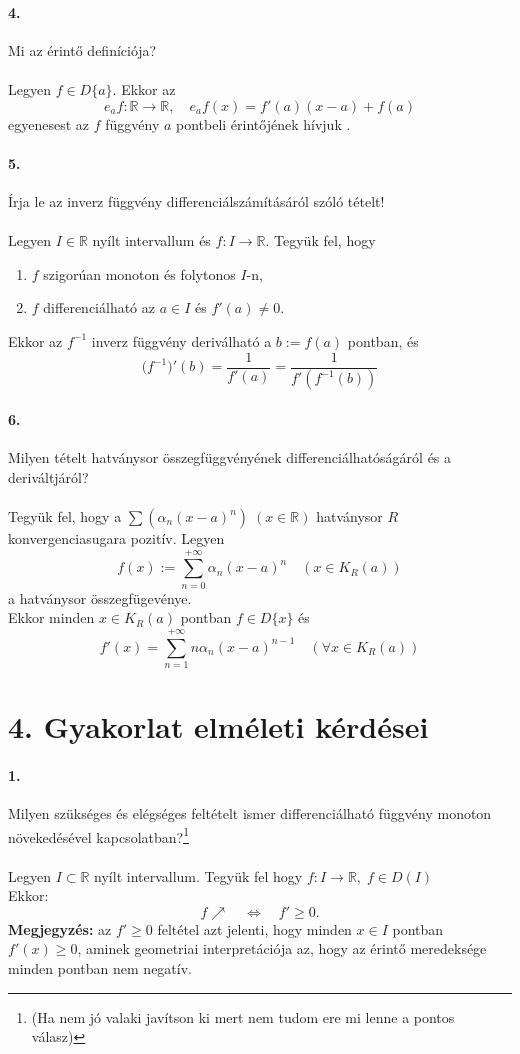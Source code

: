 \documentclass[10pt,a4paper]{article}
\newcommand{\R}{\mathbb{R}}
\renewcommand{\>}{\rightarrow}
\begin{document}
\paragraph{4.}
Mi az érintő definíciója? \\ \\
Legyen $f \in D\{a\}$. Ekkor az 
\[
e_af:\mathbb{R} \rightarrow \mathbb{R}, \quad	 e_af(x) =f'(a)(x-a)+f(a)
\]
egyenesest az $f$ függvény $a$ pontbeli érintőjének hívjuk .
\paragraph{5.}
Írja le az inverz függvény differenciálszámításáról szóló tételt!
\\ \\
Legyen $I\in\mathbb{R}$ nyílt intervallum és $f: I \rightarrow \mathbb{R}$.
Tegyük fel, hogy
\begin{enumerate}
\item $f$ szigorúan monoton és folytonos $I$-n,
\item $f$ differenciálható az $a \in I$ és $f'(a)\neq 0$.
\end{enumerate} 
Ekkor az $f^{-1}$ inverz függvény deriválható a $b:=f(a)$ pontban, és
\[
\Big( f^{-1} \Big) '(b) = \frac{1}{f'(a)} = \frac{1}{f'(f^{-1}(b))}
\]  
\paragraph{6.}
Milyen tételt hatványsor összegfüggvényének differenciálhatóságáról és a deriváltjáról? \\ \\
Tegyük fel, hogy a $\sum (\alpha_n(x-a)^n) \; (x\in\mathbb{R})$ hatványsor $R$ konvergenciasugara pozitív. Legyen
\[
f(x):= \sum\limits^{+\infty}_{n=0} \alpha_n(x-a)^n \quad (x\in K_R(a))
\] 
a hatványsor összegfügevénye. \\
Ekkor minden $x\in K_R(a)$ pontban $f\in D\{x\}$ és 
\[
f'(x) = \sum\limits^{+\infty}_{n=1} n\alpha_n(x-a)^{n-1} \quad (\forall x \in K_R(a))
\] 
\newpage
\section{4. Gyakorlat elméleti kérdései}
\paragraph{1.}
Milyen szükséges és elégséges feltételt ismer differenciálható függvény monoton növekedésével kapcsolatban?\footnote{(Ha nem jó valaki javítson ki mert nem tudom ere mi lenne a pontos válasz)\label{refnote}} \\ \\
Legyen $I \subset \R $ nyílt intervallum. Tegyük fel hogy $f : I \rightarrow \R, \; f\in D(I)$\\ Ekkor:
\[
f\nearrow \quad \Longleftrightarrow \quad f'\geq 0.
\] 
\textbf{Megjegyzés:} az $f'\geq 0$ feltétel azt jelenti, hogy minden $x\in I$ pontban $f'(x)\geq 0$, aminek geometriai interpretációja az, hogy az érintő meredeksége minden pontban
nem negatív. 
\end{document}
